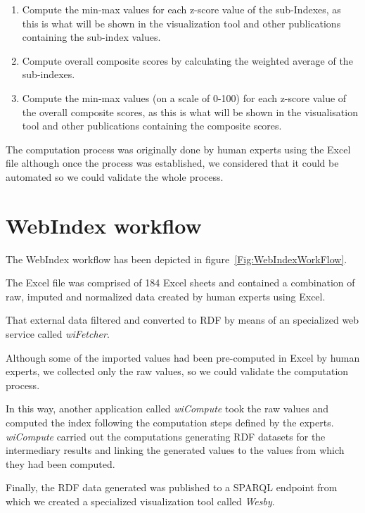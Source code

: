 \documentclass{acm_proc_article-sp}
\begin{document}
\begin{enumerate}
\item Compute the min-max values for each z-score value of the sub-Indexes, as this is what will be shown in the visualization tool and other publications containing the sub-index values.

\item Compute overall composite scores by calculating the weighted average of the sub-indexes.

\item Compute the min-max values (on a scale of 0-100) for each z-score value of the overall composite scores, as this is what will be shown in the visualisation tool and other publications containing the composite scores.
\end{enumerate}

The computation process was originally done by human experts using the Excel file although
once the process was established, we considered that it could be automated so we
could validate the whole process. 

\section{WebIndex workflow}

The WebIndex workflow has been depicted in figure~\ref{Fig:WebIndexWorkFlow}. 

The Excel file was comprised of 184 Excel sheets and contained a combination
 of raw, imputed and normalized data created by human experts using Excel. 

That external data filtered and converted to RDF by means of an specialized web service called \emph{wiFetcher}. 

Although some of the imported values had been
 pre-computed in Excel by human experts, we collected only the raw values, so we could validate the computation process. 

In this way, another application called \emph{wiCompute} took the raw values and computed the index following the
computation steps defined by the experts. 
\emph{wiCompute} carried out the computations
 generating RDF datasets for the intermediary results and linking the generated values
 to the values from which they had been computed.
 
Finally, the RDF data generated was published to a SPARQL endpoint from which we created
a specialized visualization tool called \emph{Wesby}.
\end{document}
